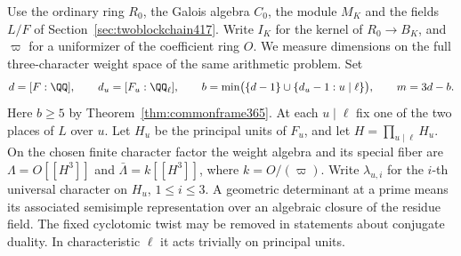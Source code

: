 \documentclass[a4paper,11pt]{article}
\theoremstyle{definition}
\theoremstyle{remark}
\numberwithin{equation}{section}
\begin{document}
Use the ordinary ring \(R_0\), the Galois algebra \(C_0\), the
module \(M_K\) and the fields \(L/F\) of
Section~\ref{sec:twoblockchain417}. Write \(I_K\) for the
kernel of \(R_0\to B_K\), and \(\varpi\) for a uniformizer of
the coefficient ring \(O\). We measure dimensions on the
full three-character weight space of the same arithmetic
problem. Set
\[
 d=[F:\QQ],\qquad d_u=[F_u:\QQ_\ell],\qquad
 b=\min\bigl(\{d-1\}\cup\{d_u-1:u\mid\ell\}\bigr),
 \qquad m=3d-b .
\]
Here \(b\ge5\) by Theorem~\ref{thm:commonframe365}. At each
\(u\mid\ell\) fix one of the two places of \(L\) over \(u\).
Let \(H_u\) be the principal units of \(F_u\), and let
\(H=\prod_{u\mid\ell}H_u\). On the chosen finite character
factor the weight algebra and its special fiber are
\(\Lambda=O[[H^3]]\) and \(\bar\Lambda=k[[H^3]]\),
where \(k=O/(\varpi)\). Write \(\lambda_{u,i}\) for the
\(i\)-th universal character on \(H_u\), \(1\le i\le3\).
A geometric determinant at a prime means its associated
semisimple representation over an algebraic closure of the
residue field. The fixed cyclotomic twist may be removed
in statements about conjugate duality. In characteristic
\(\ell\) it acts trivially on principal units.
\end{document}
